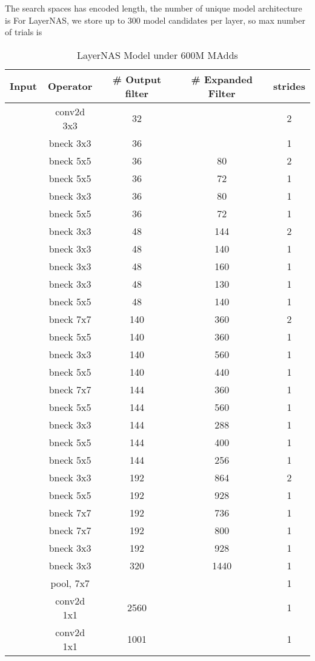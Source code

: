 The search spaces has  encoded length, the number of unique model architecture is 
For LayerNAS, we store up to 300 model candidates per layer, so max number of trials is 



\begin{table}
\caption{LayerNAS Model under 600M MAdds} 
\begin{center}

\begin{tabular}[hp]{c|c|c|c|c}
\hline
\hline
 Input &Operator  &\# Output filter &\# Expanded Filter &strides\\ 
\hline
  &conv2d 3x3 &32 & &2 \\
\hline
  &bneck 3x3 &36 & &1 \\
\hline
  &bneck 5x5 &36 &80 &2 \\
  &bneck 5x5 &36 &72 &1 \\
  &bneck 3x3 &36 &80 &1 \\
  &bneck 5x5 &36 &72 &1 \\
\hline
  &bneck 3x3 &48 &144 &2 \\
  &bneck 3x3 &48 &140 &1 \\
  &bneck 3x3 &48 &160 &1 \\
  &bneck 3x3 &48 &130 &1 \\
  &bneck 5x5 &48 &140 &1 \\
\hline
  &bneck 7x7 &140 &360 &2 \\
  &bneck 5x5 &140 &360 &1 \\
  &bneck 3x3 &140 &560 &1 \\
  &bneck 5x5 &140 &440 &1 \\
\hline
  &bneck 7x7 &144 &360 &1 \\
  &bneck 5x5 &144 &560 &1 \\
  &bneck 3x3 &144 &288 &1 \\
  &bneck 5x5 &144 &400 &1 \\
  &bneck 5x5 &144 &256 &1 \\
 \hline
  &bneck 3x3 &192 &864 &2 \\
  &bneck 5x5 &192 &928 &1 \\
  &bneck 7x7 &192 &736 &1 \\
  &bneck 7x7 &192 &800 &1 \\
  &bneck 3x3 &192 &928 &1 \\
 \hline
  &bneck 3x3 &320 &1440 &1 \\
\hline
  &pool, 7x7  & & &1\\
  &conv2d 1x1  &2560 & &1 \\
  &conv2d 1x1 &1001 & &1 \\
\hline
\hline

\end{tabular}
\end{center}
\end{table}
